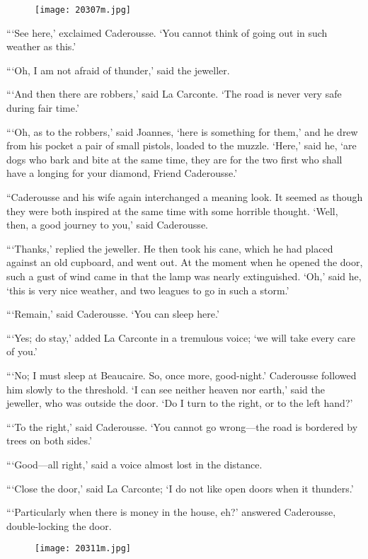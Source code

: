 \begin{figure}[h]
\texttt{[image: 20307m.jpg]}
\end{figure}

“‘See here,’ exclaimed Caderousse. ‘You cannot think of going out in
such weather as this.’

“‘Oh, I am not afraid of thunder,’ said the jeweller.

“‘And then there are robbers,’ said La Carconte. ‘The road is never
very safe during fair time.’

“‘Oh, as to the robbers,’ said Joannes, ‘here is something for them,’
and he drew from his pocket a pair of small pistols, loaded to the
muzzle. ‘Here,’ said he, ‘are dogs who bark and bite at the same time,
they are for the two first who shall have a longing for your diamond,
Friend Caderousse.’

“Caderousse and his wife again interchanged a meaning look. It seemed
as though they were both inspired at the same time with some horrible
thought. ‘Well, then, a good journey to you,’ said Caderousse.

“‘Thanks,’ replied the jeweller. He then took his cane, which he had
placed against an old cupboard, and went out. At the moment when he
opened the door, such a gust of wind came in that the lamp was nearly
extinguished. ‘Oh,’ said he, ‘this is very nice weather, and two
leagues to go in such a storm.’

“‘Remain,’ said Caderousse. ‘You can sleep here.’

“‘Yes; do stay,’ added La Carconte in a tremulous voice; ‘we will take
every care of you.’

“‘No; I must sleep at Beaucaire. So, once more, good-night.’ Caderousse
followed him slowly to the threshold. ‘I can see neither heaven nor
earth,’ said the jeweller, who was outside the door. ‘Do I turn to the
right, or to the left hand?’

“‘To the right,’ said Caderousse. ‘You cannot go wrong—the road is
bordered by trees on both sides.’

“‘Good—all right,’ said a voice almost lost in the distance.

“‘Close the door,’ said La Carconte; ‘I do not like open doors when it
thunders.’

“‘Particularly when there is money in the house, eh?’ answered
Caderousse, double-locking the door.

\begin{figure}[h]
\texttt{[image: 20311m.jpg]}
\end{figure}

